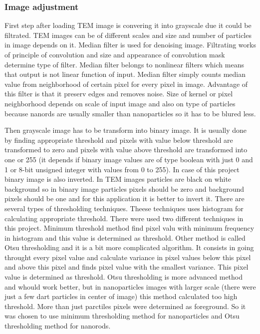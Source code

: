 \subsubsection{Image adjustment}

First step after loading TEM image is convering it into grayscale due it could
be filtrated. TEM images can be of different scales and size and number of particles
in image depends on it. Median filter is used for denoising image. Filtrating works
of principle of convolution and size and appearance of convolution mask determine type
of filter. Median filter belongs to nonlinear filters which means that output is not
linear function of input. Median filter simply counts median value from neighborhood
of certain pixel for every pixel in image. Advantage of this filter is that it
preserv edges and removes noise. Size of kernel or pixel neighborhood depends on
scale of input image and also on type of particles because nanords are usually
smaller than nanoparticles so it has to be blured less.

Then grayscale image has to be transform into binary image. It is usually done
by finding appropriate threshold and pixels with value below threshold are 
transformed to zero and pixels with value above threshold are transformed into
one or 255 (it depends if binary image values are of type boolean with just 0 and 1
or 8-bit unsigned integer with values from 0 to 255). In case of this project
binary image is also inverted. In TEM images particles are black on white background
so in binary image particles pixels should be zero and background pixels should be one
and for this application it is better to invert it. There are several types of
thresholding techniques. Theese techniques uses histogram for calculating
appropriate threshold. There were used two different techniques in this project.
Minimum threshold method find pixel valu with minimum frequency in histogram and
this value is determined as threshold. Other method is called Otsu thresholding
and it is a bit more complicated algorithm. It consists in going throught every
pixel value and calculate variance in pixel values below this pixel and above this pixel
and finds pixel value with the smallest variance. This pixel value is determined as
threshold. Otsu thresholding is more advanced method and whould work better, but
in nanoparticles images with larger scale (there were just a few dart particles in center
of image) this method calculated too high threshold. More than just parctiles pixels
were determined as foreground. So it was chosen to use minimum thresholding method for
nanoparticles and Otsu thresholding method for nanorods.

